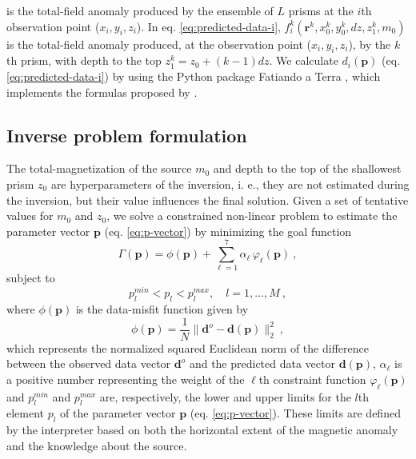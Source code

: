 is the total-field anomaly produced by the ensemble of $L$ prisms at the $i$th observation point ($x_{i}, y_{i}, z_{i}$). In eq. \ref{eq:predicted-data-i}, $f_{i}^{k}(\mathbf{r}^{k}, x_{0}^{k}, y_{0}^{k}, dz, z_{1}^{k}, m_{0})$ is the total-field anomaly produced, at the observation point ($x_{i}, y_{i}, z_{i}$), by the $k$th prism, with depth to the top $z_{1}^{k} = z_{0} + (k-1)dz$. We calculate $d_{i} (\mathbf{p})$ (eq. \ref{eq:predicted-data-i}) by using the Python package Fatiando a Terra \cite[]{uieda-etal2013}, which implements the formulas proposed by \cite{plouff1976}.

\subsection{Inverse problem formulation}

The total-magnetization of the source $m_{0}$ and depth to the top of the shallowest prism $z_{0}$ are hyperparameters of the inversion, i. e., they are not estimated during the inversion, but their value influences the final solution. Given a set of tentative values for  $m_{0}$ and $z_{0}$, we solve a constrained non-linear problem to estimate the parameter vector $\mathbf{p}$ (eq. \ref{eq:p-vector}) by minimizing the goal function
\begin{equation}
\Gamma (\mathbf{p}) = \phi (\mathbf{p}) + \sum\limits^{7}_{\ell =1} \alpha_{\ell} \, \varphi_{\ell}(\mathbf{p}) \: ,
\label{eq:gamma}
\end{equation}
subject to
\begin{equation}
p_{l}^{min} < p_{l} < p_{l}^{max}, \quad l = 1, \dots, M \: ,
\label{eq:inequality-constraint}
\end{equation}
where $\phi (\mathbf{p})$ is the data-misfit function given by
\begin{equation}\label{eq:misfit}
\phi (\mathbf{p}) = \frac{1}{N} \| \mathbf{d}^{o} - \mathbf{d}(\mathbf{p}) \|_{2}^{2} \: ,
\end{equation}
which represents the normalized squared Euclidean norm of the difference between the observed data vector $\mathbf{d}^{o}$ and the predicted data vector $\mathbf{d}(\mathbf{p})$, $\alpha_{\ell}$ is a positive number representing the weight of the $\ell$th constraint function $\varphi_{\ell}(\mathbf{p})$ and $p_{l}^{min}$ and $p_{l}^{max}$ are, respectively, the lower and upper limits for the $l$th element $p_{l}$ of the parameter vector $\mathbf{p}$ (eq. \ref{eq:p-vector}). These limits are defined by the interpreter based on both the horizontal extent of the magnetic anomaly and the knowledge about the source.

